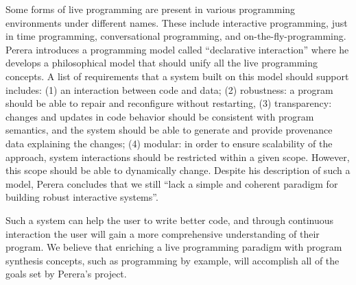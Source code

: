 Some forms of live programming are present in various programming environments under different names. These include interactive programming, just in time programming, conversational programming, and on-the-fly-programming. Perera \cite{Perera08Journal} introduces a programming model called ``declarative interaction'' where he develops  a philosophical model that should unify all the live programming concepts. A list of requirements that a system built on this model should support includes: (1) an interaction between code and data; (2) robustness: a program should be able to repair and reconfigure without restarting, (3) transparency: changes and updates in code behavior should be consistent with program semantics, and the system should be able to generate and provide provenance data explaining the changes; (4) modular: in order to ensure scalability of the approach, system interactions should be restricted within a given scope. However, this scope should be able to dynamically change. Despite his description of such a model, Perera concludes that we still ``lack a simple and coherent paradigm for building robust interactive systems''.

Such a system can help the user to write better code, and through continuous interaction the user will gain a more comprehensive understanding of their program. We believe that enriching a live programming paradigm with program synthesis concepts, such as programming by example, will accomplish all of the goals set by Perera's project.


